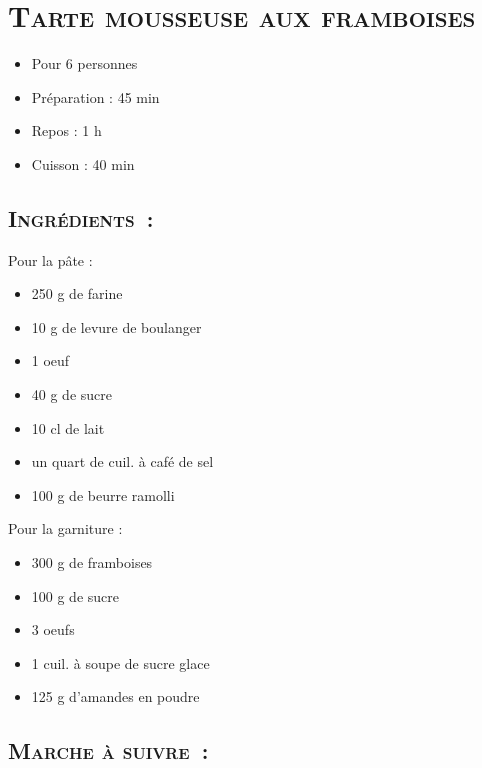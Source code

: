 \section[\normalsize{Tarte mousseuse aux framboises}]{\LARGE{\textsc{Tarte mousseuse aux framboises}}}		%


\begin{itemize}
\item Pour 6 personnes
\item Préparation : 45 min
\item Repos : 1 h
\item Cuisson : 40 min
\end{itemize}

\subsection*{\textsc{Ingr\'edients~:}}

Pour la p\^ate :
\begin{itemize}
\item	250 g de farine
\item	10 g de levure de boulanger
\item	1 oeuf
\item	40 g de sucre
\item	10 cl de lait
\item	un quart de cuil. à caf\'e de sel
\item	100 g de beurre ramolli
\end{itemize}
Pour la garniture :
\begin{itemize}
\item	300 g de framboises 
\item	100 g de sucre
\item	3 oeufs
\item	1 cuil. à soupe de sucre glace
\item	125 g d’amandes en poudre
\end{itemize}


\subsection*{\textsc{Marche \`a suivre~:}}

